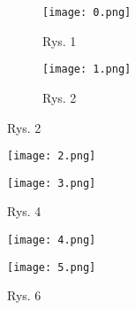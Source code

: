 \begin{figure}[!h]
    \centering
    \begin{subfigure}{.5\textwidth}
      \centering
      \texttt{[image: 0.png]}
      \caption*{Rys. 1}
      \label{fig:sub1}
    \end{subfigure}%
    \begin{subfigure}{.5\textwidth}
      \centering
      \texttt{[image: 1.png]}
      \caption*{Rys. 2}
      \label{fig:sub2}
    \end{subfigure}
    \label{fig:test}
    \end{figure}

\newpage

    \begin{figure}[!h]
    \centering
    \begin{minipage}{.5\textwidth}
      \centering
      \texttt{[image: 2.png]}
      \caption*{Rys. 3}
      \label{fig:test1}
    \end{minipage}%
    \begin{minipage}{.5\textwidth}
      \centering
      \texttt{[image: 3.png]}
      \caption*{Rys. 4}
      \label{fig:test2}
    \end{minipage}
    \end{figure}
    \begin{figure}[!h]
        \centering
        \begin{minipage}{.5\textwidth}
          \centering
          \texttt{[image: 4.png]}
          \caption*{Rys. 5}
          \label{fig:test1}
        \end{minipage}%
        \begin{minipage}{.5\textwidth}
          \centering
          \texttt{[image: 5.png]}
          \caption*{Rys. 6}
          \label{fig:test2}
        \end{minipage}
        \end{figure}
